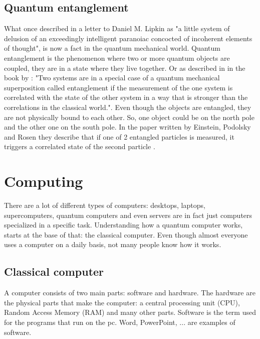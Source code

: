 \subsection{Quantum entanglement} \label{quantum entanglement}
What \textcite{Einstein} once described in a letter to Daniel M. Lipkin as "a little system of delusion of an exceedingly intelligent paranoiac concocted of incoherent elements of thought", is now a fact in the quantum mechanical world.
Quantum entanglement is the phenomenon where two or more quantum objects are coupled, they are in a state where they live together.
Or as described in in the book by \textcite{Hidary_2019}: "Two systems are in a special case of a quantum mechanical superposition called entanglement if the measurement of the one system is correlated with the state of the other system in a way that is stronger than the correlations in the classical world.".
Even though the objects are entangled, they are not physically bound to each other. So, one object could be on the north pole and the other one on the south pole.
In the paper written by Einstein, Podolsky and Rosen they describe that if one of 2 entangled particles is measured, it triggers a correlated state of the second particle \autocite{EPR}.


\section{Computing} \label{computing}
There are a lot of different types of computers: desktops, laptops, supercomputers, quantum computers and even servers are in fact just computers specialized in a specific task.
Understanding how a quantum computer works, starts at the base of that: the classical computer. Even though almost everyone uses a computer on a daily basis, not many people know how it works.


\subsection{Classical computer} \label{classical computer}
A computer consists of two main parts: software and hardware. The hardware are the physical parts that make the computer: a central processing unit (CPU), Random Access Memory (RAM) and many other parts.
Software is the term used for the programs that run on the pc. Word, PowerPoint, ... are examples of software.

